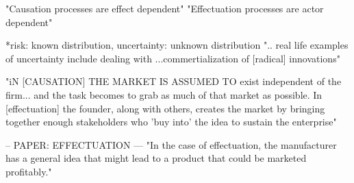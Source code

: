   "Causation processes are effect dependent"
  "Effectuation processes are actor dependent"
  
  *risk: known distribution, uncertainty: unknown distribution
  ".. real life examples of uncertainty include dealing with ...commertialization of [radical] innovations"
  
  "iN [CAUSATION] THE MARKET IS ASSUMED TO exist independent of the firm... and the task becomes to 
  grab as much of that market as possible. In [effectuation] the founder, along with others, creates the market by bringing together 
  enough stakeholders who 'buy into' the idea to sustain the enterprise"

  

 
-- PAPER: EFFECTUATION ---
"In the case of effectuation, the manufacturer has a general idea that
might lead to a product that could be marketed profitably."


